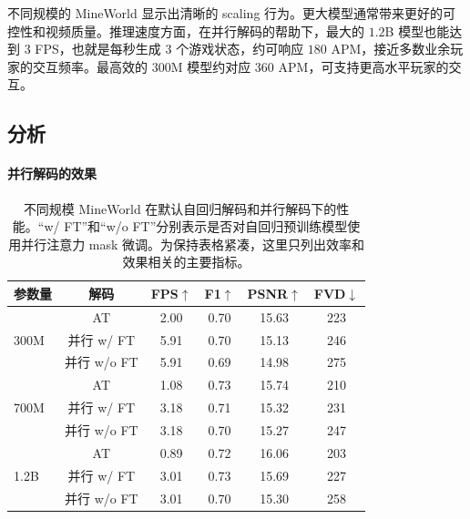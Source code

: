 \documentclass{article} %
\begin{document}
不同规模的 MineWorld 显示出清晰的 scaling 行为。更大模型通常带来更好的可控性和视频质量。推理速度方面，在并行解码的帮助下，最大的 $1.2$B 模型也能达到 $3$ FPS，也就是每秒生成 $3$ 个游戏状态，约可响应 $180$ APM，接近多数业余玩家的交互频率。最高效的 $300$M 模型约对应 $360$ APM，可支持更高水平玩家的交互。

\subsection{分析}
\label{sec:analysis}

\paragraph{并行解码的效果}

\begin{table}[tb]
\begin{center}
\small
\caption{不同规模 MineWorld 在默认自回归解码和并行解码下的性能。“w/ FT”和“w/o FT”分别表示是否对自回归预训练模型使用并行注意力 mask 微调。为保持表格紧凑，这里只列出效率和效果相关的主要指标。}
	\label{tab:parallel}
        \setlength\tabcolsep{10pt}
	\begin{tabular}{lc|cccc}
		\toprule[1pt]
		参数量&解码&FPS$\uparrow$ & F1$\uparrow$ &PSNR$\uparrow$ &FVD$\downarrow$ \\
		\midrule
		\multirow{3}{*}{300M} & AT & 2.00 & 0.70 & 15.63 & 223  \\
        	                 &并行 w/ FT& 5.91 & 0.70 & 15.13 & 246 \\
        	                 &并行 w/o FT& 5.91 & 0.69 & 14.98 & 275 \\
        \midrule
		\multirow{3}{*}{700M} & AT  & 1.08 & 0.73  & 15.74 & 210 \\
        	                 &并行 w/ FT& 3.18 & 0.71 & 15.32 & 231 \\
        	                 &并行 w/o FT& 3.18 & 0.70 & 15.27 & 247 \\ 
        \midrule
		\multirow{3}{*}{1.2B} & AT & 0.89 & 0.72 & 16.06 &  203 \\
        	                 &并行 w/ FT& 3.01 & 0.73 & 15.69 & 227 \\
        	                 &并行 w/o FT& 3.01 & 0.70 & 15.30 & 258 \\
		\bottomrule[1pt]
	\end{tabular}
 \vspace{-3mm}
\end{center}
\end{table}
\end{document}
